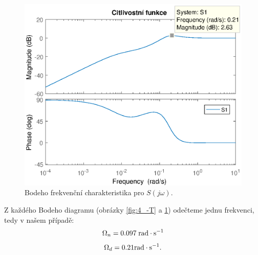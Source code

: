 \documentclass[a4paper,11pt]{article}
\begin{document}
\begin{figure}[htbp]
	\begin{center}
	\includegraphics[scale = 1.0]{obrazky/citlivostniFunkceCtyrka.eps}
	\caption{Bodeho frekvenční charakteristika pro $ S\left ( j\omega  \right ) $.}
	\label{fig:4_S}
	\end{center}
\end{figure}

Z každého Bodeho diagramu (obrázky \ref{fig:4_-T} a \ref{fig:4_S}) odečteme jednu frekvenci, tedy v našem případě:
\begin{equation} \label{eq:Omega_n}
\Omega _{n}= 0.097\; \textup{rad}\cdot\textup{s}^{-1}
\end{equation}
\begin{equation}\label{eq:Omega_d} 
\Omega _{d}= 0.21\textup{rad}\cdot\textup{s}^{-1}.
\end{equation}


\newpage 
\end{document}
